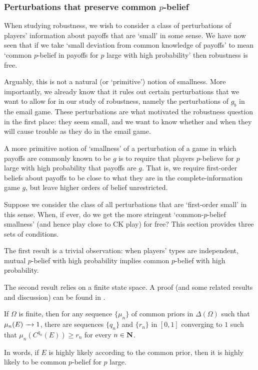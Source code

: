 \documentclass[11pt,letterpaper,reqno,oneside]{article}
\begin{document}
\subsubsection{Perturbations that preserve common \texorpdfstring{$p$}{p}-belief}
\label{sec:robustness:common_p-belief:perturbations_that_preserve}

When studying robustness, we wish to consider a class of perturbations of players' information about payoffs that are `small' in some sense. We have now seen that if we take `small deviation from common knowledge of payoffs' to mean `common $p$-belief in payoffs for $p$ large with high probability' then robustness is free.

Arguably, this is not a natural (or `primitive') notion of smallness. More importantly, we already know that it rules out certain perturbations that we want to allow for in our study of robustness, namely the perturbations of $g_b$ in the email game. These perturbations are what motivated the robustness question in the first place: they seem small, and we want to know whether and when they will cause trouble as they do in the email game.

A more primitive notion of `smallness' of a perturbation of a game in which payoffs are commonly known to be $g$ is to require that players $p$-believe for $p$ large with high probability that payoffs are $g$. That is, we require first-order beliefs about payoffs to be close to what they are in the complete-information game $g$, but leave higher orders of belief unrestricted.

Suppose we consider the class of all perturbations that are `first-order small' in this sense. When, if ever, do we get the more stringent `common-$p$-belief smallness' (and hence play close to CK play) for free? This section provides three sets of conditions.

The first result is a trivial observation: when players' types are independent, mutual $p$-belief with high probability implies common $p$-belief with high probability.

The second result relies on a finite state space. A proof (and some related results and discussion) can be found in \textcite[][sec. 14.4]{FudenbergTirole1991}.
%
\begin{proposition}
	\label{proposition:MS_Cp_properties_finite}
	If $\Omega$ is finite, then for any sequence $\{ \mu_n \}$ of common priors in $\Delta(\Omega)$ such that $\mu_n(E) \xrightarrow{\;\;\;} 1$, there are sequences $\{ q_n \}$ and $\{ r_n \}$ in $[0,1]$ converging to $1$ such that $\mu_n\left( C^{q_n}(E) \right) \geq r_n$ for every $n \in \mathbf{N}$.
\end{proposition}
%
\noindent In words, if $E$ is highly likely according to the common prior, then it is highly likely to be common $p$-belief for $p$ large.
\end{document}
